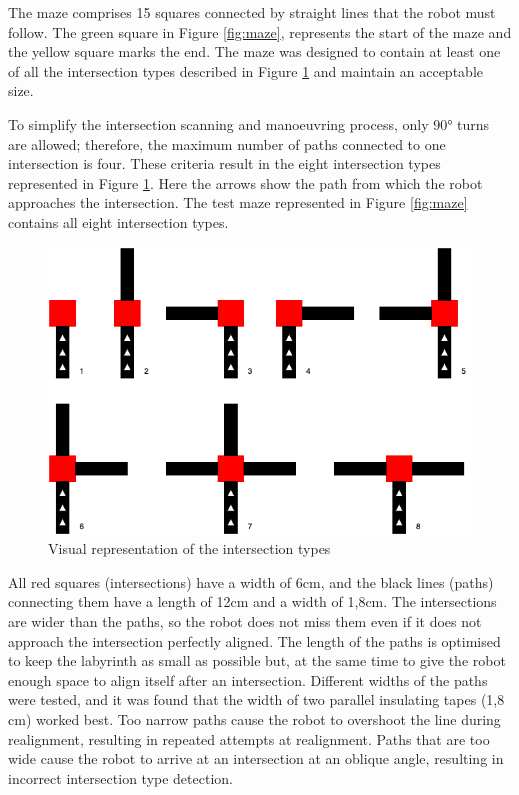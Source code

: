 The maze comprises 15 squares connected by straight lines that the robot must follow. The green square in Figure \ref{fig:maze}, represents the start of the maze and the yellow square marks the end. The maze was designed to contain at least one of all the intersection types described in Figure \ref{fig:intersection_types} and maintain an acceptable size.

To simplify the intersection scanning and manoeuvring process, only 90° turns are allowed; therefore, the maximum number of paths connected to one intersection is four. These criteria result in the eight intersection types represented in Figure \ref{fig:intersection_types}. Here the arrows show the path from which the robot approaches the intersection. The test maze represented in Figure \ref{fig:maze} contains all eight intersection types.

\begin{figure}
    \centering
    \includegraphics[width=\textwidth]{resources/intersectiontypes.png}
    \caption{Visual representation of the intersection types}
    \label{fig:intersection_types}
\end{figure}

All red squares (intersections) have a width of 6cm, and the black lines (paths) connecting them have a length of 12cm and a width of 1,8cm. The intersections are wider than the paths, so the robot does not miss them even if it does not approach the intersection perfectly aligned.
The length of the paths is optimised to keep the labyrinth as small as possible but, at the same time to give the robot enough space to align itself after an intersection. Different widths of the paths were tested, and it was found that the width of two parallel insulating tapes (1,8 cm) worked best. Too narrow paths cause the robot to overshoot the line during realignment, resulting in repeated attempts at realignment. Paths that are too wide cause the robot to arrive at an intersection at an oblique angle, resulting in incorrect intersection type detection.

